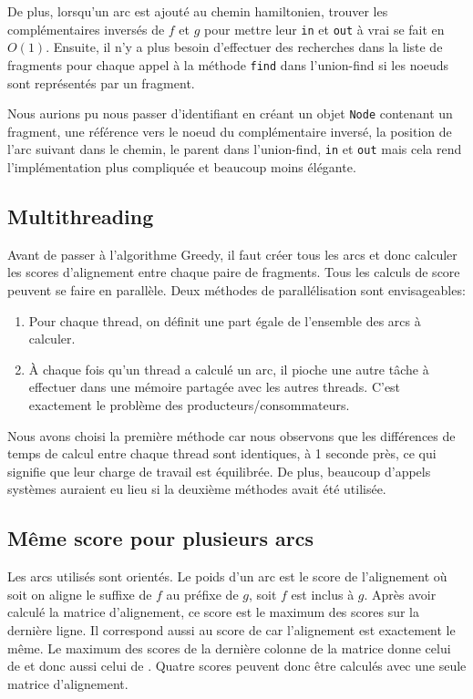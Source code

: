 De plus, lorsqu'un arc  est ajouté au chemin hamiltonien,
trouver les complémentaires inversés de $f$ et $g$ pour mettre
leur \texttt{in} et \texttt{out} à vrai se fait en $O(1)$.
Ensuite, il n'y a plus besoin d'effectuer des recherches dans
la liste de fragments pour chaque appel à la méthode \texttt{find}
dans l'union-find si les noeuds sont représentés par un fragment.

Nous aurions pu nous passer d'identifiant en créant un objet \texttt{Node}
contenant un fragment, une référence vers le noeud du complémentaire inversé,
la position de l'arc suivant dans le chemin,
le parent dans l'union-find, \texttt{in} et \texttt{out} mais
cela rend l'implémentation plus compliquée et beaucoup moins élégante.

\subsection{Multithreading}
Avant de passer à l'algorithme Greedy, il faut créer tous les arcs et donc
calculer les scores d'alignement entre chaque paire de fragments.
Tous les calculs de score peuvent se faire en parallèle.
Deux méthodes de parallélisation sont envisageables:
\begin{enumerate}
\item Pour chaque thread, on définit une part égale de l'ensemble des arcs à calculer.
\item À chaque fois qu'un thread a calculé un arc, il pioche une autre tâche à
	effectuer dans une mémoire partagée avec les autres threads.
	C'est exactement le problème des producteurs/consommateurs. %
\end{enumerate}
Nous avons choisi la première méthode car nous observons que les différences
de temps de calcul entre chaque thread sont identiques, à 1 seconde près,
ce qui signifie que leur charge de travail est équilibrée.
De plus, beaucoup d'appels systèmes auraient eu lieu si la deuxième méthodes
avait été utilisée.

\subsection{Même score pour plusieurs arcs}
Les arcs utilisés sont orientés. Le poids d'un arc  est
le score de l'alignement où soit on aligne le suffixe de $f$ au préfixe de $g$,
soit $f$ est inclus à $g$.
Après avoir calculé la matrice d'alignement, ce score est le maximum des scores sur la dernière ligne.
Il correspond aussi au score de  car l'alignement est exactement le même.
Le maximum des scores de la dernière colonne de la matrice donne celui de
 et donc aussi celui de .
Quatre scores peuvent donc être calculés avec une seule matrice d'alignement.

